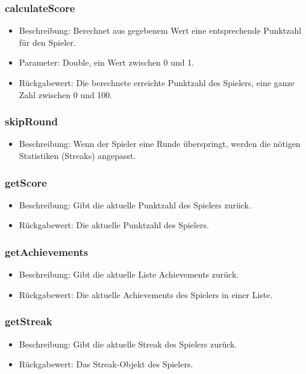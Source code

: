 \documentclass[a4paper]{scrreprt}
\begin{document}
	\subsubsection{calculateScore}
	\begin{itemize}
		\item Beschreibung: Berechnet aus gegebenem Wert eine entsprechende Punktzahl für den Spieler.
		\item Parameter: Double, ein Wert zwischen 0 und 1.
		\item Rückgabewert: Die berechnete erreichte Punktzahl des Spielers, eine ganze Zahl zwischen 0 und 100.
	\end{itemize}
	\subsubsection{skipRound}
	\begin{itemize}
		\item Beschreibung: Wenn der Spieler eine Runde überspringt, werden die nötigen Statistiken (Streaks) angepasst.
	\end{itemize}
	\subsubsection{getScore}
	\begin{itemize}
		\item Beschreibung: Gibt die aktuelle Punktzahl des Spielers zurück.
		\item Rückgabewert: Die aktuelle Punktzahl des Spielers.
	\end{itemize}
	\subsubsection{getAchievements}
	\begin{itemize}
		\item Beschreibung: Gibt die aktuelle Liste Achievements zurück.
		\item Rückgabewert: Die aktuelle Achievements des Spielers in einer Liste.
	\end{itemize}
	\subsubsection{getStreak}
	\begin{itemize}
		\item Beschreibung: Gibt die aktuelle Streak des Spielers zurück.
		\item Rückgabewert: Das Streak-Objekt des Spielers.
	\end{itemize}
\end{document}
